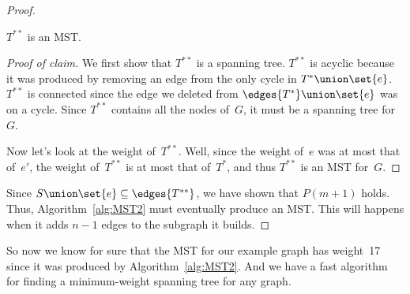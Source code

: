 \begin{proof}
\begin{claim}\label{claim:MST2}
$T^{**}$ is an MST.
\end{claim}

\begin{proof}[Proof of claim]
We first show that $T^{**}$ is a spanning tree.  $T^{**}$ is acyclic
because it was produced by removing an edge from the only cycle in
$T^{*} \union \set{e}$.  $T^{**}$ is connected since the edge we
deleted from $\edges{T^*} \union \set{e}$ was on a cycle.  Since
$T^{**}$ contains all the nodes of~$G$, it must be a spanning tree
for~$G$.

Now let's look at the weight of~$T^{**}$.  Well, since the weight
of~$e$ was at most that of~$e'$, the weight of~$T^{**}$ is at most
that of~$T^*$, and thus $T^{**}$ is an MST for~$G$.
\end{proof}

Since $S \union \set{e} \subseteq \edges{T^{**}}$, we have shown that
  $P(m + 1)$ holds.  Thus, Algorithm~\ref{alg:MST2} must eventually
  produce an MST\@.  This will happens when it adds $n - 1$ edges to
  the subgraph it builds.
\end{proof}

So now we know for sure that the MST for our example graph has
weight~17 since it was produced by Algorithm~\ref{alg:MST2}.  And we
have a fast algorithm for finding a minimum-weight spanning tree for
any graph.

\begin{problems}
\classproblems
{}

\homeworkproblems
{}
\end{problems}


\begin{problems}
\classproblems
{}


\homeworkproblems
{}

\examproblems
{}

\end{problems}

